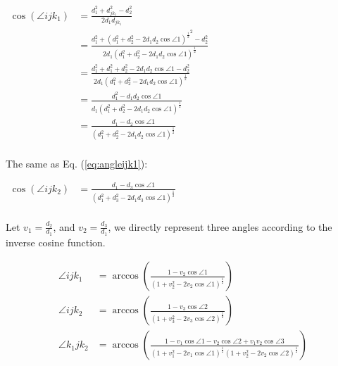 \begin{equation}
  \begin{aligned}
    \cos(\angle ijk_1) & = \frac{d_1^2 + d_{jk_1}^2 -d_2^2}{2d_1 d_{jk_1}} \\
    & = \frac{d_1^2 + {(d_1^2+d_2^2-2 d_1 d_2 \cos\angle1 )^\frac{1}{2}}^2 -d_2^2}{2d_1 {(d_1^2+d_2^2-2 d_1 d_2 \cos\angle1 )^\frac{1}{2}}} \\
    & = \frac{d_1^2 + d_1^2+d_2^2-2 d_1 d_2 \cos\angle1  -d_2^2}{2d_1 {(d_1^2+d_2^2-2 d_1 d_2 \cos\angle1 )^\frac{1}{2}}} \\
    & = \frac{d_1^2 - d_1d_2\cos\angle1}{d_1 {(d_1^2+d_2^2-2 d_1 d_2 \cos\angle1 )^\frac{1}{2}}} \\
    & = \frac{d_1 - d_2\cos\angle1}{{(d_1^2+d_2^2-2 d_1 d_2 \cos\angle1 )^\frac{1}{2}}}  \ \ \ \ \ \ \ \ \ \ \ \ \ \ \ \ \ \ \ \ \ \ \ \ \ \ \ \ \ \ \ \ \ \ \ \ \ \ \ \ \ \ \ \ \ \ \ \ \ \ \ \ \ \ \ \ \ \ \ \ \ \ \ \ \ \ \ \ \ \ \ \ \ \ \ \ \ \ \ \ \ \ \ \ \ \ \ \ \ \ \ \ \ \ \ \ 
    \\
\end{aligned}
  \label{eq:angleijk1}
\end{equation}





The same as Eq. (\ref{eq:angleijk1}):

\begin{equation}
  \begin{aligned}
    \cos(\angle ijk_2 )
    & = \frac{d_1 - d_3\cos\angle1}{{(d_1^2 + d_3^2 - 2d_1d_3 \cos\angle1 )^\frac{1}{2}}}
\ \ \ \ \ \ \ \ \ \ \ \ \ \ \ \ \ \ \ \ \ \ \ \ \ \ \ \ \ \ \ \ \ \ \ \ \ \ \ \ \ \ \ \ \ \ \ \ \ \ \ \ \ \ \ \ \ \ \ \ \ \ \ \ \ \ \ \ \ \ \ \ \ \ \ \ \ \ \ \ \ \ \ \ \ \ \ \ \ \ \ \ \ 
    \\
\end{aligned}
\end{equation}

Let $v_1 = \frac{d_2}{d_1}$, and $v_2 = \frac{d_3}{d_1}$, we directly represent three angles according to the inverse cosine function.

\begin{equation}
  \begin{aligned}
    \angle ijk_1 
    & = \arccos(\frac{1 - v_2\cos\angle1}{{(1 + v_2^2 - 2v_2 \cos\angle1 )^\frac{1}{2}}}) \\
    \angle ijk_2 
    & = \arccos(\frac{1 - v_3\cos\angle2}{{(1 + v_3^2 - 2v_3 \cos\angle2 )^\frac{1}{2}}}) \\
    \angle k_1jk_2 
    & = \arccos (
      \frac
        {
          1
          -
          v_1 \cos\angle1 
          -
          v_2 \cos\angle2 
          +
          v_1v_2 \cos\angle3 
        }{
          {(1 + v_1^2 - 2v_1 \cos\angle1 )^\frac{1}{2}}
          {(1 + v_2^2 - 2v_2 \cos\angle2 )^\frac{1}{2}}
        } 
    )
        \\
\\
\end{aligned}
\end{equation}


